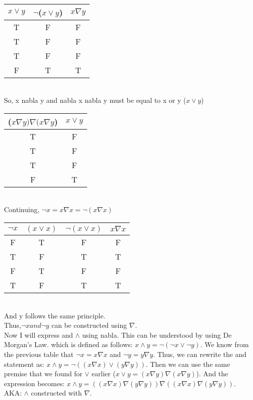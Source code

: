 \documentclass[10pt, AMS Euler]{article}
\begin{document}
\begin{enumerate}
\\\begin{tabular}{|c||c|c|}
              \hline
               $x \vee y$&$\neg$($x \vee y$)&  $x \nabla y$\\
              \hline
               T&F&  F\\
              \hline
               T&F&  F\\
              \hline
  T&F&  F\\\hline
  F&T&  T\\\hline
            \end{tabular}
\\ So, x nabla y and nabla x nabla y must be equal to x or y ($x \vee y$)
\\\begin{tabular}{|c||c|}
              \hline
               ($x \nabla y)\nabla(x \nabla y$)&$x \vee y$\\
              \hline
               T&F\\
              \hline
               T&F\\
              \hline
  T&F\\\hline
  F&T\\\hline
            \end{tabular}
\\ Continuing, $\neg x = x \nabla x = \neg(x \nabla x)$ 
\\\begin{tabular}{|c||c|c|c|}
              \hline
               $\neg x$ & $(x \vee x)$&$\neg (x \vee x)$&$x \nabla x$ \\
              \hline
               F & T&F&F \\
              \hline
               T & F&T&T\\
              \hline
  F & T&F&F \\\hline
  T & F&T&T \\\hline
            \end{tabular}
\\ And y follows the same principle. 
\\ Thus,$ \neg x and \neg y $ can be constructed using $\nabla$.
\\ Now I will express and $\wedge$ using nabla. This can be understood by using De Morgan's Law. which is defined as follows: $x \wedge y = \neg(\neg x \vee \neg y)$. We know from the previous table that $\neg x = x \nabla x$ and $\neg y = y \nabla y$. Thus, we can rewrite the and statement as: $ x \wedge y = \neg((x \nabla x) \vee (y \nabla y))$.  Then we can use the same premise that we found for $\vee$ earlier ($ x \vee y = (x \nabla y) \nabla (x \nabla y)$). And the expression becomes: $x \wedge y = ((x \nabla x) \nabla (y \nabla y)) \nabla ((x \nabla x) \nabla (y \nabla y))$. \\ AKA: $\wedge$ constructed with $\nabla$.

\end{enumerate}
\end{document}
